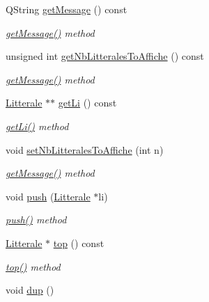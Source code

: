 \begin{DoxyCompactItemize}
\item 
Q\+String \hyperlink{class_pile_ab04b223738a2fa12b627b138a9c102ed}{get\+Message} () const 
\begin{DoxyCompactList}\small\item\em \hyperlink{class_pile_ab04b223738a2fa12b627b138a9c102ed}{get\+Message()} method \end{DoxyCompactList}\item 
unsigned int \hyperlink{class_pile_acd055c6426813bac9a127c1477c739af}{get\+Nb\+Litterales\+To\+Affiche} () const 
\begin{DoxyCompactList}\small\item\em \hyperlink{class_pile_ab04b223738a2fa12b627b138a9c102ed}{get\+Message()} method \end{DoxyCompactList}\item 
\hyperlink{class_litterale}{Litterale} $\ast$$\ast$ \hyperlink{class_pile_a6123bd7fb1405c98bf91f3b094a67c2f}{get\+Li} () const 
\begin{DoxyCompactList}\small\item\em \hyperlink{class_pile_a6123bd7fb1405c98bf91f3b094a67c2f}{get\+Li()} method \end{DoxyCompactList}\item 
void \hyperlink{class_pile_a0092075cec9c06331a86c4c9dc12ebca}{set\+Nb\+Litterales\+To\+Affiche} (int n)
\begin{DoxyCompactList}\small\item\em \hyperlink{class_pile_ab04b223738a2fa12b627b138a9c102ed}{get\+Message()} method \end{DoxyCompactList}\item 
void \hyperlink{class_pile_abf3bd33dc3b024dabeda45f020256637}{push} (\hyperlink{class_litterale}{Litterale} $\ast$li)
\begin{DoxyCompactList}\small\item\em \hyperlink{class_pile_abf3bd33dc3b024dabeda45f020256637}{push()} method \end{DoxyCompactList}\item 
\hyperlink{class_litterale}{Litterale} $\ast$ \hyperlink{class_pile_a2321894a738fbfe3a7ffcf55507f567b}{top} () const 
\begin{DoxyCompactList}\small\item\em \hyperlink{class_pile_a2321894a738fbfe3a7ffcf55507f567b}{top()} method \end{DoxyCompactList}\item 
void \hyperlink{class_pile_a081f7843d01cae1f0f7be7d92e46d5d2}{dup} ()
$$
\end{DoxyCompactItemize}
